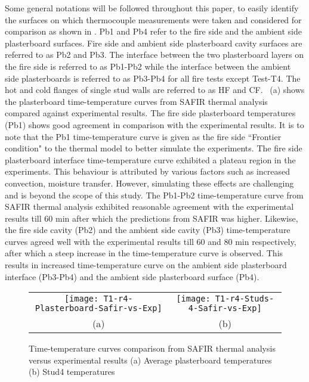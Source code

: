 Some general notations will be followed throughout this paper, to easily identify the surfaces on which thermocouple measurements were taken and considered for comparison as shown in . Pb1 and Pb4 refer to the fire side and the ambient side plasterboard surfaces. Fire side and ambient side plasterboard cavity surfaces are referred to as Pb2 and Pb3. The interface between the two plasterboard layers on the fire side is referred to as Pb1-Pb2 while the interface between the ambient side plasterboards is referred to as Pb3-Pb4 for all fire tests except Test-T4. The hot and cold flanges of single stud walls are referred to as HF and CF. ~(a) shows the plasterboard time-temperature curves from SAFIR thermal analysis compared against experimental results. The fire side plasterboard temperatures (Pb1) shows good agreement in comparison with the experimental results. It is to note that the Pb1 time-temperature curve is given as the fire side ``Frontier condition" to the thermal model to better simulate the experiments. The fire side plasterboard interface time-temperature curve exhibited a plateau region in the experiments. This behaviour is attributed by various factors such as increased convection, moisture transfer. However, simulating these effects are challenging and is beyond the scope of this study. The Pb1-Pb2 time-temperature curve from SAFIR thermal analysis exhibited reasonable agreement with the experimental results till 60 min after which the predictions from SAFIR was higher. Likewise, the fire side cavity (Pb2) and the ambient side cavity (Pb3) time-temperature curves agreed well with the experimental results till 60 and 80 min respectively, after which a steep increase in the time-temperature curve is observed. This results in increased time-temperature curve on the ambient side plasterboard interface (Pb3-Pb4) and the ambient side plasterboard surface (Pb4). 
\begin{figure}[!htbp]
	\centering
		\begin{tabular}{cc}
			\texttt{[image: T1-r4-Plasterboard-Safir-vs-Exp]} & \texttt{[image: T1-r4-Studs-4-Safir-vs-Exp]} \\
			(a) & (b) \\
		\end{tabular} 
		\caption{Time-temperature curves comparison from SAFIR thermal analysis versus experimental results (a) Average plasterboard temperatures (b) Stud4 temperatures}
		\label{fig:T1-safir-vs-experiment}
\end{figure}

